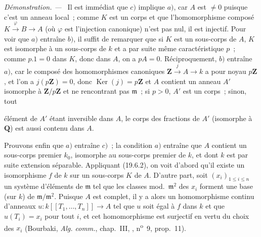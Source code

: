 \documentclass[10pt,oneside]{book}
\newcommand{\oldpage}[2][]{%
  \setcounter{footnote}{0}%
  \marginpar{\scriptsize\textbf{#1}~|~#2}\ignorespaces}
\newenvironment{proof}{%
  \par\medskip\noindent\textit{Démonstration. ---\ }}{\par}
\begin{document}
\begin{proof}
Il est immédiat que $c)$ implique $a)$, car $A$ est $\neq0$ puisque c'est un
anneau local~; comme $K$ est un corps et que l'homomorphisme composé
$K\xrightarrow{\varphi}B\to A$ (où $\varphi$ est l'injection canonique) n'est
pas nul, il est injectif. Pour voir que $a)$ entraîne $b)$, il suffit de
remarquer que si $K$ est un sous-corps de $A$, $K$ est isomorphe à un
sous-corps de $k$ et a par suite même caractéristique $p$~; comme $p.1=0$ dans
$K$, donc dans $A$, on a $pA=0$. Réciproquement, $b)$ entraîne $a)$, car le
composé des homomorphismes canoniques
$\mathbf Z\xrightarrow{j}A\to k$ a pour noyau $p\mathbf Z$, et l'on a
$j(p\mathbf Z)=0$, donc $\operatorname{Ker}(j)=p\mathbf Z$ et $A$ contient un
anneau $A'$ isomorphe à $\mathbf Z/p\mathbf Z$ et ne rencontrant pas
$\mathfrak m$~; si $p>0$, $A'$ est un corps~; sinon, tout

\oldpage[0\textsubscript{IV-1}]{102}

élément de $A'$ étant inversible dans $A$, le corps des fractions de $A'$
(isomorphe à $\mathbf Q$) est aussi contenu dans $A$.

Prouvons enfin que $a)$ entraîne $c)$~; la condition $a)$ entraîne que $A$
contient un sous-corps premier $k_0$, isomorphe au sous-corps premier de $k$,
et dont $k$ est par suite extension séparable. Appliquant (19.6.2), on voit
d'abord qu'il existe un isomorphisme $f$ de $k$ sur un sous-corps $K$ de $A$.
D'autre part, soit $(x_i)_{1\leq i\leq n}$ un système d'éléments de
$\mathfrak m$ tel que les classes mod.~$\mathfrak m^2$ des $x_i$ forment une
base (sur $k$) de $\mathfrak m/\mathfrak m^2$. Puisque $A$ est complet, il y a
alors un homomorphisme continu d'anneaux
$u:k[[T_1,\ldots,T_n]]\to A$ tel que $u$ soit égal à $f$ dans $k$ et que
$u(T_i)=x_i$ pour tout $i$, et cet homomorphisme est surjectif en vertu du
choix des $x_i$ (Bourbaki, \emph{Alg. comm.}, chap.~III, ,
n\textsuperscript{o}~9, prop.~11).
\end{proof}
\end{document}
